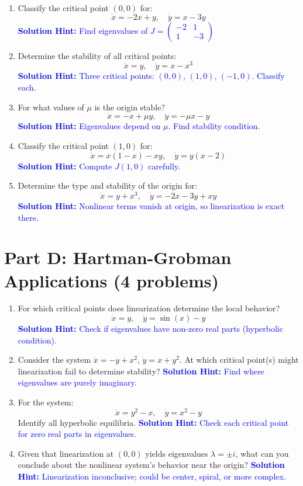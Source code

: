 \documentclass[12pt]{article}
\newcommand{\solution}[1]{\textcolor{blue}{\textbf{Solution Hint:} #1}}
\begin{document}
\begin{enumerate}[resume]
\item Classify the critical point $(0,0)$ for:
$$\dot{x} = -2x + y, \quad \dot{y} = x - 3y$$
\solution{Find eigenvalues of $J = \begin{pmatrix} -2 & 1 \\ 1 & -3 \end{pmatrix}$}

\item Determine the stability of all critical points:
$$\dot{x} = y, \quad \dot{y} = x - x^3$$
\solution{Three critical points: $(0,0)$, $(1,0)$, $(-1,0)$. Classify each.}

\item For what values of $\mu$ is the origin stable?
$$\dot{x} = -x + \mu y, \quad \dot{y} = -\mu x - y$$
\solution{Eigenvalues depend on $\mu$. Find stability condition.}

\item Classify the critical point $(1, 0)$ for:
$$\dot{x} = x(1-x) - xy, \quad \dot{y} = y(x-2)$$
\solution{Compute $J(1,0)$ carefully.}

\item Determine the type and stability of the origin for:
$$\dot{x} = y + x^3, \quad \dot{y} = -2x - 3y + xy$$
\solution{Nonlinear terms vanish at origin, so linearization is exact there.}
\end{enumerate}

\section*{Part D: Hartman-Grobman Applications (4 problems)}

\begin{enumerate}[resume]
\item For which critical points does linearization determine the local behavior?
$$\dot{x} = y, \quad \dot{y} = \sin(x) - y$$
\solution{Check if eigenvalues have non-zero real parts (hyperbolic condition).}

\item Consider the system $\dot{x} = -y + x^2$, $\dot{y} = x + y^2$.
At which critical point(s) might linearization fail to determine stability?
\solution{Find where eigenvalues are purely imaginary.}

\item For the system:
$$\dot{x} = y^2 - x, \quad \dot{y} = x^2 - y$$
Identify all hyperbolic equilibria.
\solution{Check each critical point for zero real parts in eigenvalues.}

\item Given that linearization at $(0,0)$ yields eigenvalues $\lambda = \pm i$, what can you conclude about the nonlinear system's behavior near the origin?
\solution{Linearization inconclusive; could be center, spiral, or more complex.}
\end{enumerate}
\end{document}
